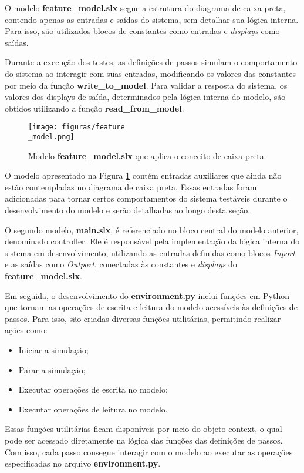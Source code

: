 O modelo \textbf{feature\_model.slx} segue a estrutura do diagrama de caixa preta, contendo apenas as entradas e saídas do sistema, sem detalhar sua lógica interna. Para 
isso, são utilizados blocos de constantes como entradas e \textit{displays} como saídas.

Durante a execução dos testes, as definições de passos simulam o comportamento do sistema ao interagir com suas entradas, modificando os valores das constantes por 
meio da função \textbf{write\_to\_model}. Para validar a resposta do sistema, os valores dos displays de saída, determinados pela lógica interna do modelo, são obtidos utilizando 
a função \textbf{read\_from\_model}.

\begin{figure}[H]
\centering
\texttt{[image: figuras/feature\\\_model.png]}
\caption{Modelo \textbf{feature\_model.slx} que aplica o conceito de caixa preta.}
\label{fig:featuremodel}
\end{figure}

O modelo apresentado na Figura \ref{fig:featuremodel} contém entradas auxiliares que ainda não estão contempladas no diagrama de caixa preta. Essas entradas foram adicionadas para tornar certos 
comportamentos do sistema testáveis durante o desenvolvimento do modelo e serão detalhadas ao longo desta seção.

O segundo modelo, \textbf{main.slx}, é referenciado no bloco central do modelo anterior, denominado controller. Ele é responsável pela implementação da lógica interna 
do sistema em desenvolvimento, utilizando as entradas definidas como blocos \textit{Inport} e as saídas como \textit{Outport}, conectadas às constantes e \textit{displays} 
do \textbf{feature\_model.slx}.

Em seguida, o desenvolvimento do \textbf{environment.py} inclui funções em Python que tornam as operações de escrita e leitura do modelo acessíveis às definições de passos. 
Para isso, são criadas diversas funções utilitárias, permitindo realizar ações como:

\begin{itemize}
	\item Iniciar a simulação;
	\item Parar a simulação;
	\item Executar operações de escrita no modelo;
	\item Executar operações de leitura no modelo.
\end{itemize}

Essas funções utilitárias ficam disponíveis por meio do objeto context, o qual pode ser acessado diretamente na lógica das funções das definições de passos. Com isso, 
cada passo consegue interagir com o modelo ao executar as operações especificadas no arquivo \textbf{environment.py}.

